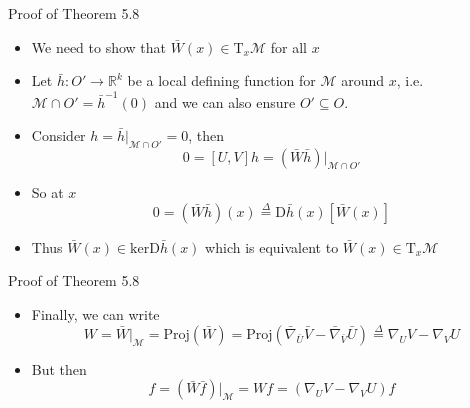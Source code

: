 \documentclass{beamer}
\begin{document}
\begin{frame}{Proof of Theorem 5.8}
    \begin{itemize}[<+->]
        \item We need to show that $\bar{W}(x) \in \text{T}_x \mathcal{M}$ for all $x$
        \item Let $\bar{h} : O' \to \mathbb{R}^{k}$ be a local defining function for $\mathcal{M}$ around $x$, i.e. $\mathcal{M} \cap O' = \bar{h}^{-1}(0)$ and we can also ensure $O' \subseteq O$. 
        \item Consider $h = \bar{h}|_{\mathcal{M} \cap O'} = 0$, then 
        \begin{equation}
            0 = [U, V]h = (\bar{W} \bar{h})|_{\mathcal{M} \cap O'}
        \end{equation}
        \item So at $x$ 
        \begin{equation}
            0 = (\bar{W}\bar{h})(x) \overset{\Delta}{=} \text{D}\bar{h}(x) [\bar{W}(x)]
        \end{equation}
        \item Thus $\bar{W}(x) \in \text{ker} \text{D}\bar{h}(x)$ which is equivalent to $\bar{W}(x) \in \text{T}_x \mathcal{M}$
    \end{itemize}
\end{frame}

\begin{frame}{Proof of Theorem 5.8}
    \begin{itemize}
        \item Finally, we can write 
        \begin{equation*}
            W = \bar{W}|_\mathcal{M} = \text{Proj}(\bar{W}) = \text{Proj}(\bar{\nabla}_{\bar{U}} \bar{V} - \bar{\nabla}_{\bar{V}} \bar{U}) \overset{\Delta}{=} \nabla_U V - \nabla_V U
        \end{equation*}
        \item But then 
        \begin{equation}
            [U, V]f = (\bar{W}\bar{f})|_\mathcal{M} = Wf = (\nabla_U V - \nabla_V U)f
        \end{equation}
    \end{itemize}
\end{frame}
\end{document}
